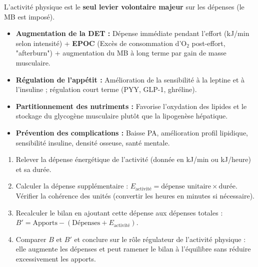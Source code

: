\documentclass[11pt]{article}
\begin{document}
\begin{propriete}
L'activité physique est le \textbf{seul levier volontaire majeur} sur les dépenses (le MB est imposé).
\begin{itemize}
\item \textbf{Augmentation de la DET :} Dépense immédiate pendant l'effort (kJ/min selon intensité) + \textbf{EPOC} (Excès de consommation d'O$_2$ post-effort, "afterburn") + augmentation du MB à long terme par gain de masse musculaire.
\item \textbf{Régulation de l'appétit :} Amélioration de la sensibilité à la leptine et à l'insuline ; régulation court terme (PYY, GLP-1, ghréline).
\item \textbf{Partitionnement des nutriments :} Favorise l'oxydation des lipides et le stockage du glycogène musculaire plutôt que la lipogenèse hépatique.
\item \textbf{Prévention des complications :} Baisse PA, amélioration profil lipidique, sensibilité insuline, densité osseuse, santé mentale.
\end{itemize}
\end{propriete}

\begin{methode}
\begin{enumerate}
\item Relever la dépense énergétique de l'activité (donnée en kJ/min ou kJ/heure) et sa durée.
\item Calculer la dépense supplémentaire : $E_{\text{activité}} = \text{dépense unitaire} \times \text{durée}$. Vérifier la cohérence des unités (convertir les heures en minutes si nécessaire).
\item Recalculer le bilan en ajoutant cette dépense aux dépenses totales : $B' = \text{Apports} - (\text{Dépenses} + E_{\text{activité}})$.
\item Comparer $B$ et $B'$ et conclure sur le rôle régulateur de l'activité physique : elle augmente les dépenses et peut ramener le bilan à l'équilibre sans réduire excessivement les apports.
\end{enumerate}
\end{methode}
\end{document}
